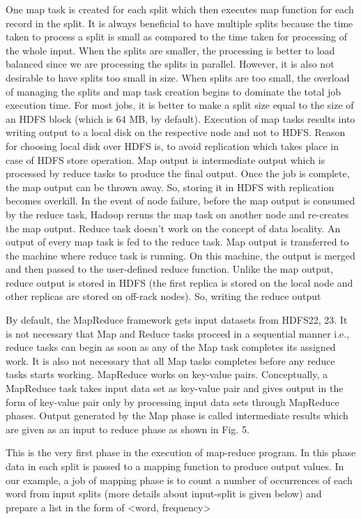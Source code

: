 \documentclass[11pt]{book}
\begin{document}
One map task is created for each split which then executes map function for each record in the split.
It is always beneficial to have multiple splits because the time taken to process a split is small as compared to the time taken for processing of the whole input. When the splits are smaller, the processing is better to load balanced since we are processing the splits in parallel.
However, it is also not desirable to have splits too small in size. When splits are too small, the overload of managing the splits and map task creation begins to dominate the total job execution time.
For most jobs, it is better to make a split size equal to the size of an HDFS block (which is 64 MB, by default).
Execution of map tasks results into writing output to a local disk on the respective node and not to HDFS.
Reason for choosing local disk over HDFS is, to avoid replication which takes place in case of HDFS store operation.
Map output is intermediate output which is processed by reduce tasks to produce the final output.
Once the job is complete, the map output can be thrown away. So, storing it in HDFS with replication becomes overkill.
In the event of node failure, before the map output is consumed by the reduce task, Hadoop reruns the map task on another node and re-creates the map output.
Reduce task doesn't work on the concept of data locality. An output of every map task is fed to the reduce task. Map output is transferred to the machine where reduce task is running.
On this machine, the output is merged and then passed to the user-defined reduce function.
Unlike the map output, reduce output is stored in HDFS (the first replica is stored on the local node and other replicas are stored on off-rack nodes). So, writing the reduce output


 By default, the MapReduce framework gets input datasets from HDFS22, 23. It is
not necessary that Map and Reduce tasks proceed in a sequential manner i.e., reduce tasks can begin as soon as any
of the Map task completes its assigned work. It is also not necessary that all Map tasks completes before any reduce
tasks starts working. MapReduce works on key-value pairs. Conceptually, a MapReduce task takes input data set as
key-value pair and gives output in the form of key-value pair only by processing input data sets through MapReduce
phases. Output generated by the Map phase is called intermediate results which are given as an input to reduce phase
as shown in Fig. 5.
 

This is the very first phase in the execution of map-reduce program. In this phase data in each split is passed to a mapping function to produce output values. In our example, a job of mapping phase is to count a number of occurrences of each word from input splits (more details about input-split is given below) and prepare a list in the form of <word, frequency>
\end{document}

